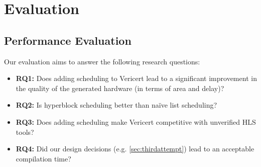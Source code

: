 \chapter{Evaluation}

\section{Performance Evaluation}
\label{sec:performance-comparison}

Our evaluation aims to answer the following research questions:

\begin{itemize}

\item {\textbf{RQ1:}} Does adding scheduling to Vericert lead to a significant improvement in the quality of the generated hardware (in terms of area and delay)?

\item {\textbf{RQ2:}} Is hyperblock scheduling better than na\"ive list scheduling?

\item {\textbf{RQ3:}} Does adding scheduling make Vericert competitive with unverified HLS tools?

\item {\textbf{RQ4:}} Did our design decisions (e.g. \cref{sec:thirdattempt}) lead to an acceptable compilation time?

\end{itemize}



\newcommand\BambuDefault{%
\setul{-1pt}{3pt}\setulcolor{colorBambuDefaultLIGHT}%
{\ul{\textsf{Bambu-default}}}}

\newcommand\BambuNoOpt{%
\setul{-1pt}{3pt}\setulcolor{colorBambuNoOptLIGHT}%
{\ul{\textsf{Bambu-no-opt}}}}

\newcommand\VericertBase{%
\setul{-1pt}{3pt}\setulcolor{colorVericertBaseLIGHT}%
{\ul{\textsf{Vericert-original}}}}

